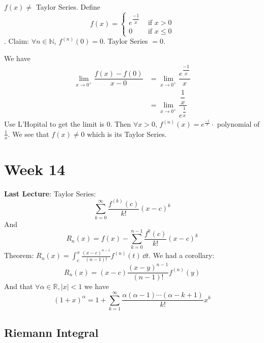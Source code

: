 \documentclass{report}
\begin{document}
\begin{examples}
    \begin{example}
        $f(x) \neq $ Taylor Series. Define
            \begin{equation*}
                f(x) = \begin{cases}
                    e^{\dfrac{-1}{x}} &\text{ if } x> 0 \\
                    0 &\text{ if } x \leq 0            
                \end{cases}
            \end{equation*}.
        Claim: $\forall n \in \mathbb{N}$, $f^{(n)}(0) = 0$. Taylor Series $= 0$. 

        We have 
            \begin{align*}
                \lim\limits_{x \to 0^{+}}\dfrac{f(x) - f(0)}{x - 0} &= \lim\limits_{x \to 0^{+}}\dfrac{e^{\dfrac{-1}{x}}}{x} \\
                                                                    &= \lim\limits_{x \to 0^{+}}\dfrac{\dfrac{1}{x}}{e^{\dfrac{1}{x}}}
            \end{align*}
        Use L'Hopital to get the limit is $0$. Then $\forall x > 0$, $f^{(n)}(x) = e^{\frac{-1}{x}} \cdot$ polynomial of $\frac{1}{x}$. We see that $f(x) \neq 0$ which is its Taylor Series.
    \end{example}
\end{examples}

\chapter{Week 14}

\textbf{Last Lecture}: Taylor Series:
    \begin{equation*}
        \sum_{k = 0}^{\infty} \dfrac{f^{(k)}(c)}{k!}(x - c)^{k}
    \end{equation*}
And
    \begin{equation*}
        R_{n}(x) = f(x) - \sum_{k = 0}^{n - 1}\dfrac{f^{k}(c)}{k!}(x -c)^{k}
    \end{equation*} 
Theorem: $R_{n}(x) = \int_{c}^{x} \frac{(x - c)^{n - 1}}{(n - 1)!}f^{(n)}(t) \, \dd{t} $. We had a corollary:
    \begin{equation*}
        R_{n}(x) = (x - c)\dfrac{(x - y)^{n - 1}}{(n - 1)!}f^{(n)}(y)
    \end{equation*}
And that $\forall \alpha \in \mathbb{R}, \lvert x \rvert < 1$ we have
    \begin{equation*}
        (1 + x)^{\alpha} = 1 + \sum_{k = 1}^{\infty}\dfrac{\alpha (\alpha - 1)\cdots (\alpha - k + 1)}{k!}x^{ k}
    \end{equation*}
\begin{topic}
    \section{Riemann Integral}
\end{topic}
\end{document}
